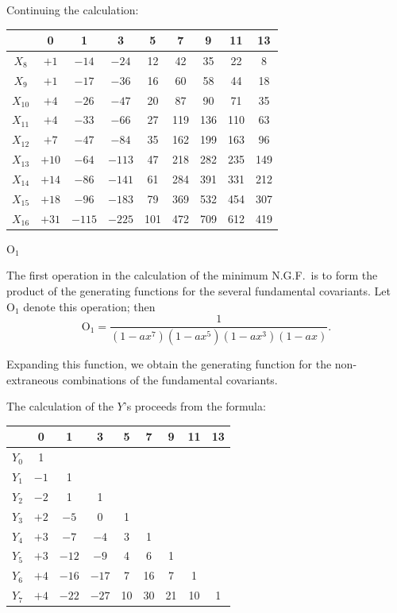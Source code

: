 \documentclass[11pt,a4paper]{book}
\begin{document}
\clearpage
Continuing the calculation:

\begin{center}
\begin{tabular}{c|cccccccc}
& 0 & 1 & 3 & 5 & 7 & 9 & 11 & 13 \\
\hline
$X_8$ & $+1$ & $-14$ & $-24$ & 12 & 42 & 35 & 22 & 8 \\
$X_9$ & $+1$ & $-17$ & $-36$ & 16 & 60 & 58 & 44 & 18 \\
$X_{10}$ & $+4$ & $-26$ & $-47$ & 20 & 87 & 90 & 71 & 35 \\
$X_{11}$ & $+4$ & $-33$ & $-66$ & 27 & 119 & 136 & 110 & 63 \\
$X_{12}$ & $+7$ & $-47$ & $-84$ & 35 & 162 & 199 & 163 & 96 \\
$X_{13}$ & $+10$ & $-64$ & $-113$ & 47 & 218 & 282 & 235 & 149 \\
$X_{14}$ & $+14$ & $-86$ & $-141$ & 61 & 284 & 391 & 331 & 212 \\
$X_{15}$ & $+18$ & $-96$ & $-183$ & 79 & 369 & 532 & 454 & 307 \\
$X_{16}$ & $+31$ & $-115$ & $-225$ & 101 & 472 & 709 & 612 & 419
\end{tabular}
\end{center}

\clearpage
$\mathrm{O}_1$

The first operation in the calculation of the minimum N.G.F.\ is to form the product of the generating functions for the several fundamental covariants. Let $\mathrm{O}_1$ denote this operation; then
\[
\mathrm{O}_1 = \frac{1}{(1 - ax^7)(1 - ax^5)(1 - ax^3)(1 - ax)}.
\]

Expanding this function, we obtain the generating function for the non-extraneous combinations of the fundamental covariants.

The calculation of the $Y$'s proceeds from the formula:

\begin{center}
\begin{tabular}{c|cccccccc}
& 0 & 1 & 3 & 5 & 7 & 9 & 11 & 13 \\
\hline
$Y_0$ & 1 & & & & & & & \\
$Y_1$ & $-1$ & 1 & & & & & & \\
$Y_2$ & $-2$ & 1 & 1 & & & & & \\
$Y_3$ & $+2$ & $-5$ & 0 & 1 & & & & \\
$Y_4$ & $+3$ & $-7$ & $-4$ & 3 & 1 & & & \\
$Y_5$ & $+3$ & $-12$ & $-9$ & 4 & 6 & 1 & & \\
$Y_6$ & $+4$ & $-16$ & $-17$ & 7 & 16 & 7 & 1 & \\
$Y_7$ & $+4$ & $-22$ & $-27$ & 10 & 30 & 21 & 10 & 1
\end{tabular}
\end{center}
\end{document}
